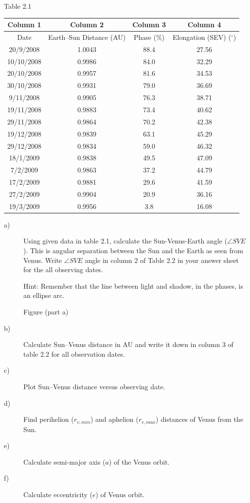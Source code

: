 \begin{center}
Table 2.1

\begin{tabular}{c|c|c|c}
Column 1 & Column 2 & Column 3 & Column 4 \\
\hline
Date & Earth--Sun Distance (AU) & Phase (\%)
  & Elongation (SEV) ($^\circ$) \\
\hline
20/9/2008   & 1.0043 & 88.4 & 27.56 \\
10/10/2008  & 0.9986 & 84.0 & 32.29 \\
20/10/2008  & 0.9957 & 81.6 & 34.53 \\
30/10/2008  & 0.9931 & 79.0 & 36.69 \\
9/11/2008   & 0.9905 & 76.3 & 38.71 \\
19/11/2008  & 0.9883 & 73.4 & 40.62 \\
29/11/2008  & 0.9864 & 70.2 & 42.38 \\
19/12/2008  & 0.9839 & 63.1 & 45.29 \\
29/12/2008  & 0.9834 & 59.0 & 46.32 \\
18/1/2009   & 0.9838 & 49.5 & 47.09 \\
7/2/2009    & 0.9863 & 37.2 & 44.79 \\
17/2/2009   & 0.9881 & 29.6 & 41.59 \\
27/2/2009   & 0.9904 & 20.9 & 36.16 \\
19/3/2009   & 0.9956 & 3.8  & 16.08 \\
\end{tabular}
\end{center}

\begin{description}
\item[a)] Using given data in table 2.1, calculate the Sun-Venus-Earth angle
  ($\angle SVE$). This is angular separation between the Sun and the Earth as
  seen from Venus. Write $\angle SVE$ angle in column 2 of Table 2.2 in your
  answer sheet for the all observing dates.

  Hint: Remember that the line between light and shadow, in the phases, is an
  ellipse arc.

\begin{center}
Figure (part a)
\end{center}

\item[b)] Calculate Sun--Venus distance in AU and write it down in column 3
  of table 2.2 for all observation dates.
\item[c)] Plot Sun--Venus distance versus observing date.
\item[d)] Find perihelion ($r_{v,min}$) and aphelion ($r_{v,max}$) distances
  of Venus from the Sun.
\item[e)] Calculate semi-major axis ($a$) of the Venus orbit.
\item[f)] Calculate eccentricity ($e$) of Venus orbit.
\end{description}

